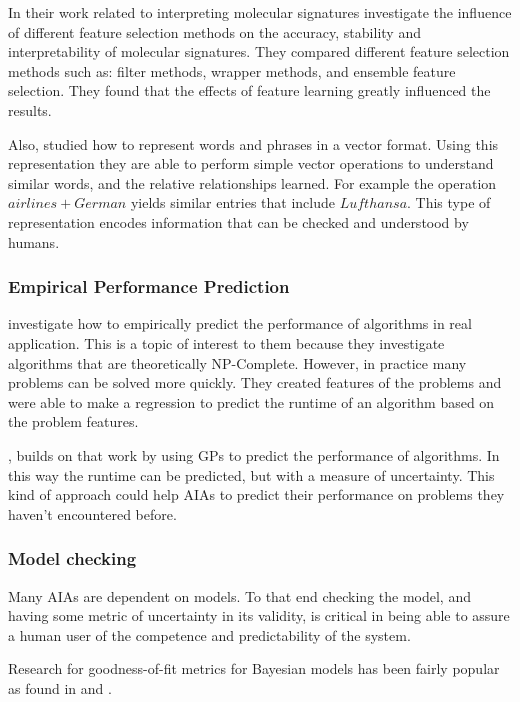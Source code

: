     In their work related to interpreting molecular signatures \citet{Haury2011-zi} investigate the influence of different feature selection methods on the accuracy, stability and interpretability of molecular signatures. They compared different feature selection methods such as: filter methods, wrapper methods, and ensemble feature selection. They found that the effects of feature learning greatly influenced the results. 

    Also, \citet{Mikolov2013-lt} studied how to represent words and phrases in a vector format. Using this representation they are able to perform simple vector operations to understand similar words, and the relative relationships learned. For example the operation $airlines+German$ yields similar entries that include $Lufthansa$. This type of representation encodes information that can be checked and understood by humans.

\subsubsection{Empirical Performance Prediction}
    \citet{Leyton-Brown2009-yr} investigate how to empirically predict the performance of algorithms in real application. This is a topic of interest to them because they investigate algorithms that are theoretically NP-Complete. However, in practice many problems can be solved more quickly. They created features of the problems and were able to make a regression to predict the runtime of an algorithm based on the problem features.

    \citet{Hutter2006-ak}, builds on that work by using GPs to predict the performance of algorithms. In this way the runtime can be predicted, but with a measure of uncertainty.  This kind of approach could help AIAs to predict their performance on problems they haven't encountered before.

\subsubsection{Model checking} 
    Many AIAs are dependent on models. To that end checking the model, and having some metric of uncertainty in its validity, is critical in being able to assure a human user of the competence and predictability of the system.
    
    Research for goodness-of-fit metrics for Bayesian models has been fairly popular as found in \citet{Dannemann2008-ch,Johnson2004-mv,Yuan2012-tb} and \citet{Spiegelhalter2002-ia}.

